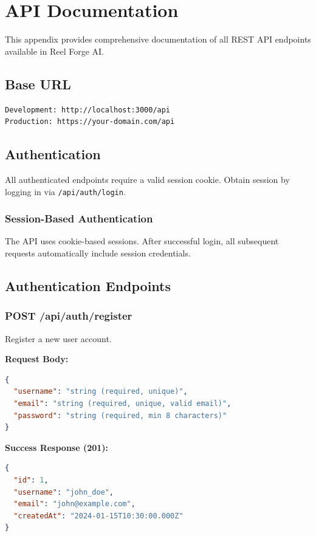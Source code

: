 \chapter{API Documentation}
\label{appendix:api}

This appendix provides comprehensive documentation of all REST API endpoints available in Reel Forge AI.

\section{Base URL}

\begin{verbatim}
Development: http://localhost:3000/api
Production: https://your-domain.com/api
\end{verbatim}

\section{Authentication}

All authenticated endpoints require a valid session cookie. Obtain session by logging in via \texttt{/api/auth/login}.

\subsection{Session-Based Authentication}

The API uses cookie-based sessions. After successful login, all subsequent requests automatically include session credentials.

\section{Authentication Endpoints}

\subsection{POST /api/auth/register}

Register a new user account.

\textbf{Request Body:}
\begin{lstlisting}[language=JSON]
{
  "username": "string (required, unique)",
  "email": "string (required, unique, valid email)",
  "password": "string (required, min 8 characters)"
}
\end{lstlisting}

\textbf{Success Response (201):}
\begin{lstlisting}[language=JSON]
{
  "id": 1,
  "username": "john_doe",
  "email": "john@example.com",
  "createdAt": "2024-01-15T10:30:00.000Z"
}
\end{lstlisting}

